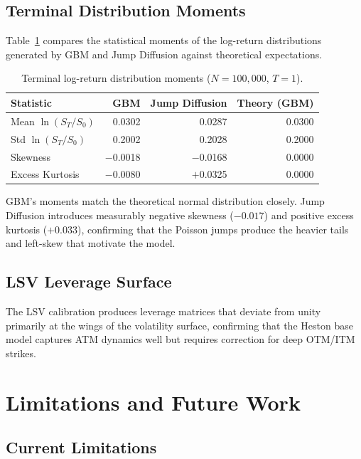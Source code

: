 \documentclass[12pt,a4paper]{article}
\begin{document}
\subsection{Terminal Distribution Moments}

Table~\ref{tab:moments} compares the statistical moments of the log-return distributions generated by GBM and Jump Diffusion against theoretical expectations.

\begin{table}[H]
\centering
\caption{Terminal log-return distribution moments ($N = 100{,}000$, $T = 1$).}
\label{tab:moments}
\begin{tabular}{@{}lrrr@{}}
\toprule
Statistic & GBM & Jump Diffusion & Theory (GBM) \\
\midrule
Mean $\ln(S_T/S_0)$        & 0.0302  & 0.0287  & 0.0300 \\
Std $\ln(S_T/S_0)$         & 0.2002  & 0.2028  & 0.2000 \\
Skewness                   & $-$0.0018 & $-$0.0168 & 0.0000 \\
Excess Kurtosis            & $-$0.0080 & $+$0.0325 & 0.0000 \\
\bottomrule
\end{tabular}
\end{table}

GBM's moments match the theoretical normal distribution closely. Jump Diffusion introduces measurably negative skewness ($-0.017$) and positive excess kurtosis ($+0.033$), confirming that the Poisson jumps produce the heavier tails and left-skew that motivate the model.

\subsection{LSV Leverage Surface}

The LSV calibration produces leverage matrices that deviate from unity primarily at the wings of the volatility surface, confirming that the Heston base model captures ATM dynamics well but requires correction for deep OTM/ITM strikes.

\section{Limitations and Future Work}

\subsection{Current Limitations}
\end{document}
